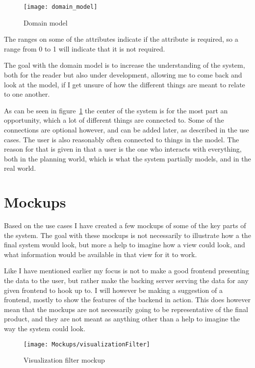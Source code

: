 \begin{figure}[h]
  \centering
  \texttt{[image: domain\_model]}
  \caption{Domain model}
  \label{fig:domain_model}
\end{figure}

The ranges on some of the attributes indicate if the attribute is required, so a range from 0 to 1 will indicate that it is not required.

The goal with the domain model is to increase the understanding of the system, both for the reader but also under development, allowing me to come back and look at the model, if I get unsure of how the different things are meant to relate to one another.

As can be seen in figure~\ref{fig:domain_model} the center of the system is for the most part an opportunity, which a lot of different things are connected to. Some of the connections are optional however, and can be added later, as described in the use cases. The user is also reasonably often connected to things in the model. The reason for that is given in that a user is the one who interacts with everything, both in the planning world, which is what the system partially models, and in the real world.

\section{Mockups}
\label{sec:Mockups}
Based on the use cases I have created a few mockups of some of the key parts of the system. The goal with these mockups is not necessarily to illustrate how a the final system would look, but more a help to imagine how a view could look, and what information would be available in that view for it to work.

Like I have mentioned earlier my focus is not to make a good frontend presenting the data to the user, but rather make the backing server serving the data for any given frontend to hook up to. I will however be making a suggestion of a frontend, mostly to show the features of the backend in action. This does however mean that the mockups are not necessarily going to be representative of the final product, and they are not meant as anything other than a help to imagine the way the system could look.

\begin{figure}
  \centering
  \texttt{[image: Mockups/visualizationFilter]}
  \caption{Visualization filter mockup}
  \label{fig:VisualizationFilter}
\end{figure}

